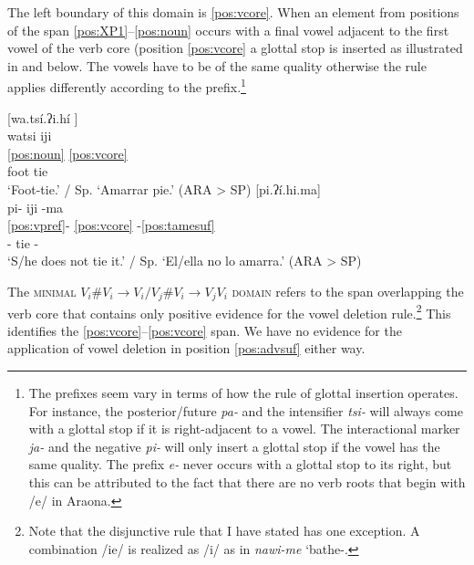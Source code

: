 \documentclass[output=paper,hidelinks]{langscibook}
\begin{document}
The left boundary of this domain is \ref{pos:vcore}. When an element from positions of the span \ref{pos:XP1}--\ref{pos:noun} occurs with a final vowel adjacent to the first vowel of the verb core (position \ref{pos:vcore} a glottal stop is inserted as illustrated in  and  below. The vowels have to be of the same quality otherwise the rule applies differently according to the prefix.\footnote{The prefixes seem vary in terms of how the rule of glottal insertion operates. For instance, the posterior/future \textit{pa-} and the intensifier \textit{tsi-} will always come with a glottal stop if it is right-adjacent to a vowel. The interactional marker \textit{ja-} and the negative \textit{pi-} will only insert a glottal stop if the vowel has the same quality. The prefix \textit{e-} never occurs with a glottal stop to its right, but this can be attributed to the fact that there are no verb roots that begin with /e/ in Araona.}


\ea 
 \ea \label{ex:watsiiji}
    [wa.tsí.ʔi.hí \downarrow] \\
    \glll watsi iji \\ 
    \ref{pos:noun} \ref{pos:vcore}    \\
    foot tie    \\
    \glt `Foot-tie.' / Sp. `Amarrar pie.' \hfill (ARA > SP)
 \ex \label{ex:piijima}
    [pi.ʔí.hi.ma]   \\
    \glll pi- iji -ma  \\ 
    \ref{pos:vpref}- \ref{pos:vcore} -\ref{pos:tamesuf}    \\
    \Neg{}- tie -\Neg{}    \\
    \glt `S/he does not tie it.' / Sp. `El/ella no lo amarra.' \hfill (ARA > SP)
 \z
\z 


The \textsc{minimal $V{_i}\#V{_i} \rightarrow V{_i} / V{_j}\#V{_i} \rightarrow V{_j}V{_i}$ domain} refers to the span overlapping the verb core that contains only positive evidence for the vowel deletion rule.\footnote{Note that the disjunctive rule that I have stated has one exception. A combination /ie/ is realized as /i/ as in \textit{nawi-me} `bathe-\Caus{}.} This identifies the \ref{pos:vcore}--\ref{pos:vcore} span. We have no evidence for the application of vowel deletion in position \ref{pos:advsuf} either way.

\end{document}
